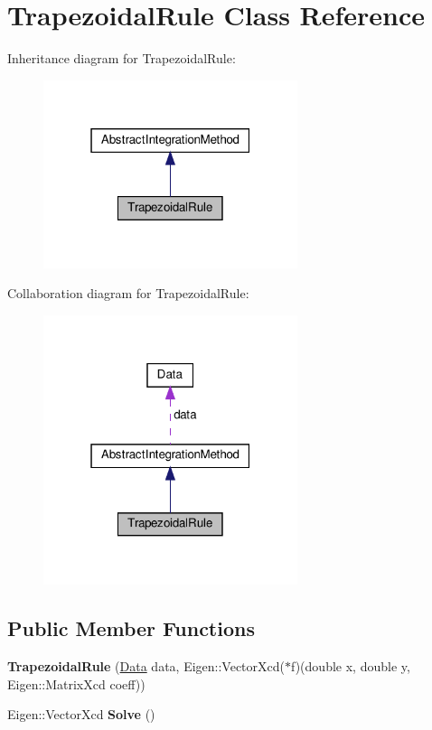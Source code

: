 \hypertarget{classTrapezoidalRule}{}\section{Trapezoidal\+Rule Class Reference}
\label{classTrapezoidalRule}


Inheritance diagram for Trapezoidal\+Rule\+:\nopagebreak
\begin{figure}[H]
\begin{center}
\leavevmode
\includegraphics[width=211pt]{classTrapezoidalRule__inherit__graph}
\end{center}
\end{figure}


Collaboration diagram for Trapezoidal\+Rule\+:\nopagebreak
\begin{figure}[H]
\begin{center}
\leavevmode
\includegraphics[width=211pt]{classTrapezoidalRule__coll__graph}
\end{center}
\end{figure}
\subsection*{Public Member Functions}
\begin{DoxyCompactItemize}
\item 
\mbox{\label{classTrapezoidalRule_ac366b3b5a8758ad00590f029c0b0bdd7}} 
{\bfseries Trapezoidal\+Rule} (\hyperlink{structData}{Data} data, Eigen\+::\+Vector\+Xcd($\ast$f)(double x, double y, Eigen\+::\+Matrix\+Xcd coeff))
\item 
\mbox{\label{classTrapezoidalRule_ae822d86948bdc8876bf524cd620e11b8}} 
Eigen\+::\+Vector\+Xcd {\bfseries Solve} ()
\end{DoxyCompactItemize}
